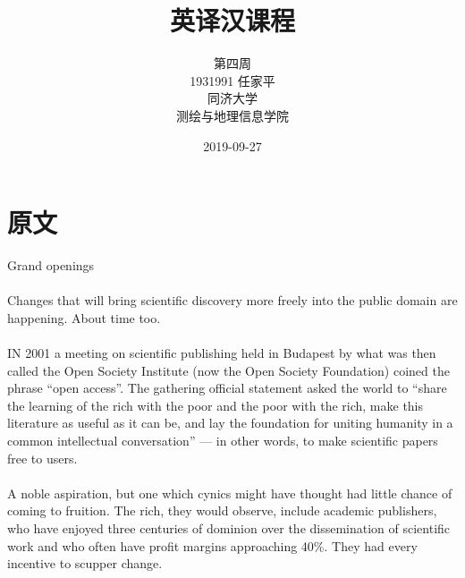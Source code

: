 \documentclass[a4paper, 12pt, UTF8]{article}
\begin{document}
\title{\Huge 英译汉课程}
\author{\Large 
        第四周 \\[12pt]
        1931991 任家平 \\[12pt]
        同济大学 \\[12pt]
        测绘与地理信息学院}
\date{2019-09-27}

\maketitle
\thispagestyle{empty}


\newpage
{}
\tableofcontents
{}

\newpage
{}
\section{原文}
\begin{bfseries}
    \Large
    Grand openings
    \paragraph*{}
    \large
    Changes that will bring scientific discovery more freely into the public domain are happening. About time too.
\end{bfseries}

\paragraph*{}
    IN 2001 a meeting on scientific publishing held in Budapest by what was then called the Open Society Institute (now the Open Society Foundation) coined the phrase “open access”. The gathering official statement asked the world to “share the learning of the rich with the poor and the poor with the rich, make this literature as useful as it can be, and lay the foundation for uniting humanity in a common intellectual conversation” --- in other words, to make scientific papers free to users.

\paragraph*{}
    A noble aspiration, but one which cynics might have thought had little chance of coming to fruition. The rich, they would observe, include academic publishers, who have enjoyed three centuries of dominion over the dissemination of scientific work and who often have profit margins approaching 40\%. They had every incentive to scupper change.
\end{document}
